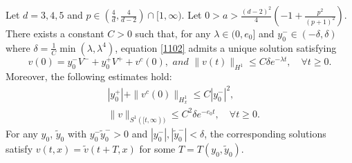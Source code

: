 \documentclass[10pt,a4paper]{amsart}
\newcommand{\R}{\mathbb R}
\begin{document}
\begin{theorem}\label{exiuni} 
Let $d=3,4,5$ and $p\in (\tfrac 4d, \tfrac 4{d-2})\cap [1,\infty)$. Let $0>a>\tfrac{(d-2)^2}4(-1+\frac{p^2}{(p+1)^2}).$ There exists a constant $C>0$ such that, for any $\lambda\in(0, e_0]$ and $y_0^- \in (-\delta, \delta)$ where 
$\delta=\frac 1{C} \min(\lambda,\lambda^4)$, equation \eqref{1102} admits a unique solution satisfying  
\begin{equation} \label{E:class}
v(0)=y_0^-V^-+y_0^+V^++v^c(0), \textit{ and } \|v(t) \|_{H^1}
\le C \delta e^{-\lambda t},  \quad \forall t\ge 0.
\end{equation}
Moreover, the following estimates hold:
\begin{align}\label{438}
& |y_0^+|+\|v^c(0)\|_{H^1_x}\le C |y_0^-|^2, \\
& \|v\|_{ S^1([t,\infty))}\le C^2 \delta e^{-e_0 t}, \quad \forall t\ge 0. 
\end{align}
For any $y_0$, $\tilde y_0$ with $y_0^-\tilde y_0^->0$ and $|y_0^-|, |\tilde y_0^-|< \delta$, the corresponding solutions satisfy $v(t,x)=\tilde v(t+T,x)$ for some $T=T(y_0, \tilde y_0)$. 
\end{theorem}
\end{document}
